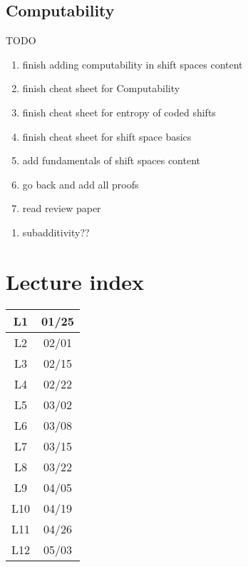 \documentclass[11pt, reqno]{amsart}
\theoremstyle{plain}
\numberwithin{thm}{subsection}
\theoremstyle{definition}
\begin{document}
{\begin{multicols}{2}
\subsection{Computability}

\end{multicols}
}

TODO
\begin{enumerate}
  \item finish adding computability in shift spaces content
  \item finish cheat sheet for Computability
  \item finish cheat sheet for entropy of coded shifts 
  \item finish cheat sheet for shift space basics
  \item add fundamentals of shift spaces content 
  \item go back and add all proofs
  \item read review paper
\end{enumerate}

\begin{enumerate}
  \item subadditivity??
\end{enumerate}

\newpage
\section{Lecture index}  

\begin{tabular}{|c|c|}\hline
  L1 & 01/25 \\ \hline
  L2 & 02/01 \\ \hline
  L3 & 02/15 \\ \hline
  L4 & 02/22 \\ \hline
  L5 & 03/02 \\ \hline
  L6 & 03/08 \\ \hline
  L7 & 03/15 \\ \hline
  L8 & 03/22 \\ \hline
  L9 & 04/05 \\ \hline
  L10 & 04/19 \\ \hline
  L11 & 04/26 \\ \hline
  L12 & 05/03 \\ \hline
\end{tabular}

\printbibliography
\end{document}
